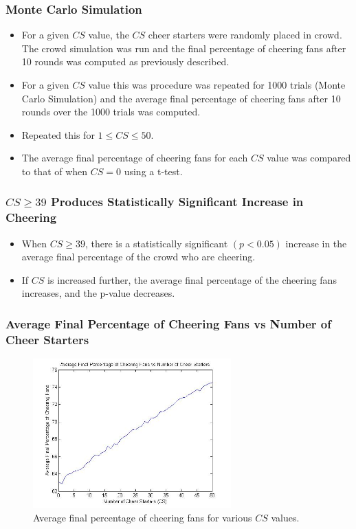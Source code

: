 \documentclass[compress,handout,10pt]{beamer}
\let\olditem\item
\renewcommand{\item}{\setlength{\itemsep}{0.5\baselineskip}\olditem}
\begin{document}
\begin{frame}
	\frametitle{Monte Carlo Simulation}
	\begin{itemize}
		\item For a given $CS$ value, the $CS$ cheer starters were randomly placed in crowd. The crowd simulation was run and the final percentage of cheering fans after 10 rounds was computed as previously described.
		\item For a given $CS$ value this was procedure was repeated for 1000 trials (Monte Carlo Simulation) and the average final percentage of cheering fans after 10 rounds over the 1000 trials was computed. 
		\item Repeated this for $1 \leq CS \leq 50$.
		\item The average final percentage of cheering fans for each $CS$ value was compared to that of when $CS=0$ using a t-test. 
	\end{itemize}
\end{frame}

\begin{frame}
	\frametitle{$CS\geq 39$ Produces Statistically Significant Increase in Cheering}
	\begin{itemize}
		\item When $CS\geq39$, there is a statistically significant $(p<0.05)$ increase in the average final percentage of the crowd who are cheering.
		\item If $CS$ is increased further, the average final percentage of the cheering fans increases, and the p-value decreases.
	\end{itemize}
\end{frame}

\begin{frame}
	\frametitle{Average Final Percentage of Cheering Fans vs Number of Cheer Starters}
	\begin{figure} [h]
		\begin{center}
    			\includegraphics [width=3in] {46(1).jpg}
    			\caption {{\tiny Average final percentage of cheering fans for various $CS$ values.}}
    		\end{center}
    	\end {figure}	
\end{frame}
\end{document}
